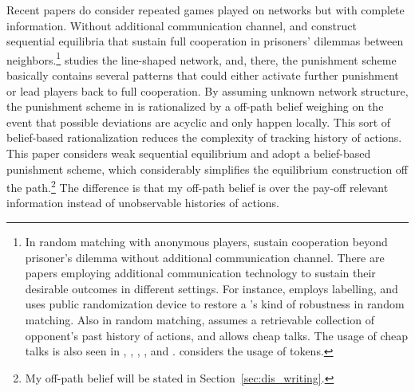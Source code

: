 \documentclass[12pt,letter]{article}
\theoremstyle{definition}
\theoremstyle{definition}
\theoremstyle{remark}
\theoremstyle{claim}
\begin{document}
Recent papers do consider repeated games played on networks but with complete information. Without additional communication channel, \citep{Xue2004} and \citep{Nava2014} construct sequential equilibria that sustain full cooperation in prisoners' dilemmas between neighbors.\footnote{In random matching with anonymous players, \citep{Deb2019a} sustain cooperation beyond prisoner's dilemma without additional communication channel. There are papers employing additional communication technology to sustain their desirable outcomes in different settings. For instance, \citep{Kandori1992} employs labelling, and \citep{Ellison1994} uses public randomization device to restore a \citep{Kandori1992}'s kind of robustness in random matching. Also in random matching, \citep{Takahashi2010} assumes a retrievable collection of opponent's past history of actions, and \citep{Deb2019b} allows cheap talks. The usage of cheap talks is also seen in \citep{Ben-Porath1996}, \citep{Tomala2011}, \citep{LIPPERT2011}, \citep{Ali2016}, \citep{LACLAU2014136} and \citep{Laclau2012}. \citep{Wolitzky2014} considers the usage of tokens.}
\citep{Xue2004} studies the line-shaped network, and, there, the punishment scheme basically contains several patterns that could either activate further punishment or lead players back to full cooperation. By assuming unknown network structure, the punishment scheme in \citep{Nava2014} is rationalized by a off-path belief weighing on the event that possible deviations are acyclic and only happen locally. This sort of belief-based rationalization reduces the complexity of tracking history of actions. This paper considers weak sequential equilibrium and adopt a belief-based punishment scheme, which considerably simplifies the equilibrium construction off the path.\footnote{My off-path belief will be stated in Section~\ref{sec:dis_writing}.} 
The difference is that my off-path belief is over the pay-off relevant information instead of unobservable histories of actions. 
\end{document}
